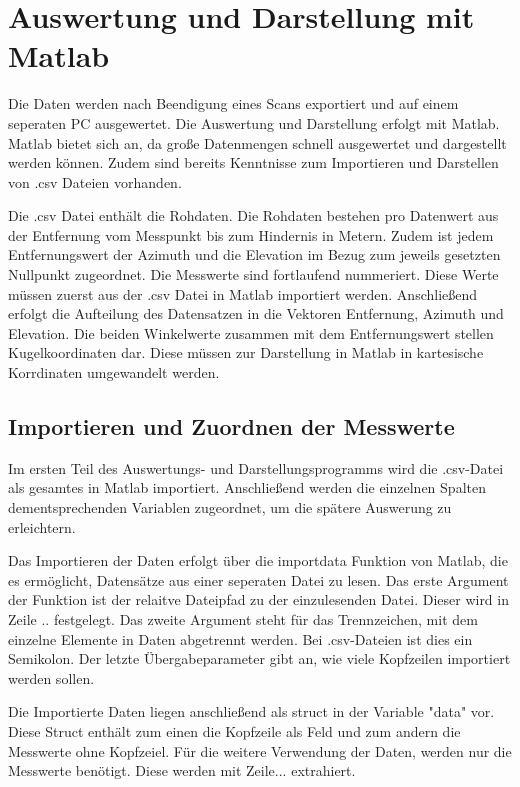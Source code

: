 

\chapter{Auswertung und Darstellung mit Matlab}

Die Daten werden nach Beendigung eines Scans exportiert und auf einem seperaten PC ausgewertet. Die Auswertung und Darstellung erfolgt mit Matlab. Matlab bietet sich an, da große Datenmengen schnell ausgewertet und dargestellt werden können. Zudem sind bereits Kenntnisse zum Importieren und Darstellen von .csv Dateien vorhanden. 

Die .csv Datei enthält die Rohdaten. Die Rohdaten bestehen pro Datenwert aus der Entfernung vom Messpunkt bis zum Hindernis in Metern. Zudem ist jedem Entfernungswert der Azimuth und die Elevation im Bezug zum jeweils gesetzten Nullpunkt zugeordnet. Die Messwerte sind fortlaufend nummeriert. 
Diese Werte müssen zuerst aus der .csv Datei in Matlab importiert werden. Anschließend erfolgt die Aufteilung des Datensatzen in die Vektoren Entfernung, Azimuth und Elevation.
Die beiden Winkelwerte zusammen mit dem Entfernungswert stellen Kugelkoordinaten dar. Diese müssen zur Darstellung in Matlab in kartesische Korrdinaten umgewandelt werden. 



\section{Importieren und Zuordnen der Messwerte}

Im ersten Teil des Auswertungs- und Darstellungsprogramms wird die .csv-Datei als gesamtes in Matlab importiert. Anschließend werden die einzelnen Spalten dementsprechenden Variablen zugeordnet, um die spätere Auswerung zu erleichtern.

Das Importieren der Daten erfolgt über die importdata Funktion von Matlab, die es ermöglicht, Datensätze aus einer seperaten Datei zu lesen. Das erste Argument der Funktion ist der relaitve Dateipfad zu der einzulesenden Datei. Dieser wird in Zeile .. festgelegt. Das zweite Argument steht für das Trennzeichen, mit dem einzelne Elemente in Daten abgetrennt werden. Bei .csv-Dateien ist dies ein Semikolon. Der letzte Übergabeparameter gibt an, wie viele Kopfzeilen importiert werden sollen.

Die Importierte Daten liegen anschließend als struct in der Variable "data" vor. Diese Struct enthält zum einen die Kopfzeile als Feld und zum andern die Messwerte ohne Kopfzeiel. Für die weitere Verwendung der Daten, werden nur die Messwerte benötigt. Diese werden mit Zeile... extrahiert. 

